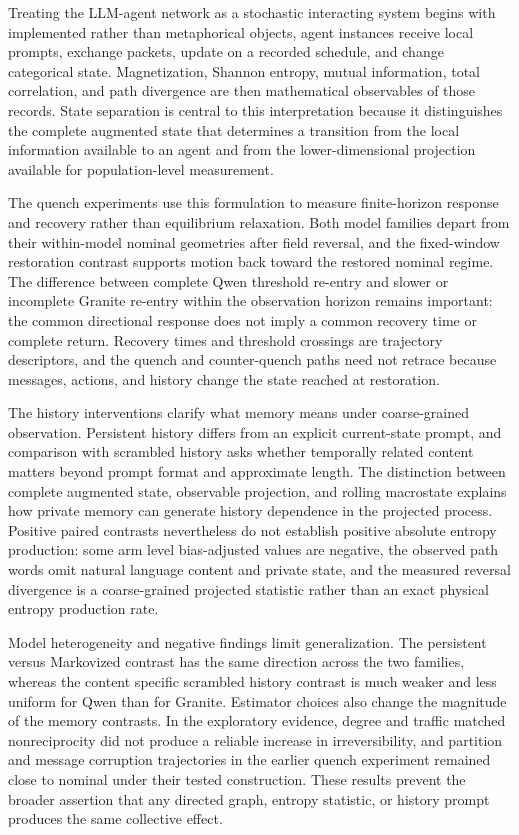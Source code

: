\documentclass[12pt]{article}
\begin{document}
Treating the LLM-agent network as a stochastic interacting system begins with
implemented rather than metaphorical objects, agent instances receive local
prompts, exchange packets, update on a recorded schedule, and change
categorical state.  Magnetization, Shannon entropy, mutual information, total
correlation, and path divergence are then mathematical observables of those
records.  State separation is central to this interpretation because it
distinguishes the complete augmented state that determines a transition from
the local information available to an agent and from the lower-dimensional
projection available for population-level measurement.

The quench experiments use this formulation to measure finite-horizon response
and recovery rather than equilibrium relaxation.  Both model families depart
from their within-model nominal geometries after field reversal, and the
fixed-window restoration contrast supports motion back toward the restored
nominal regime.  The difference between complete Qwen threshold re-entry and
slower or incomplete Granite re-entry within the observation horizon remains
important: the common directional response does not imply a common recovery
time or complete return.  Recovery times and threshold crossings are
trajectory descriptors, and the quench and counter-quench paths need not
retrace because messages, actions, and history change the state reached at
restoration.

The history interventions clarify what memory means under coarse-grained
observation.  Persistent history differs from an explicit current-state
prompt, and comparison with scrambled history asks whether temporally related
content matters beyond prompt format and approximate length.  The distinction
between complete augmented state, observable projection, and rolling
macrostate explains how private memory can generate history dependence in the
projected process.  Positive paired contrasts nevertheless do not establish
positive absolute entropy production: some arm level bias-adjusted values are
negative, the observed path words omit natural language content and private
state, and the measured reversal divergence is a coarse-grained projected
statistic rather than an exact physical entropy production rate.

Model heterogeneity and negative findings limit generalization.  The
persistent versus Markovized contrast has the same direction across the two
families, whereas the content specific scrambled history contrast is much
weaker and less uniform for Qwen than for Granite.  Estimator choices also
change the magnitude of the memory contrasts.  In the exploratory evidence,
degree  and traffic matched nonreciprocity did not produce a reliable increase
in irreversibility, and partition and message corruption trajectories in the
earlier quench experiment remained close to nominal under their tested
construction.  These results prevent the broader assertion that any directed
graph, entropy statistic, or history prompt produces the same collective
effect.
\end{document}

